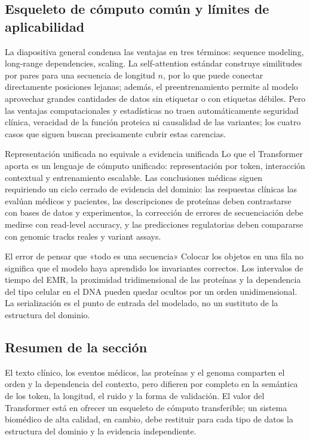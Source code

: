 \subsection{Esqueleto de cómputo común y límites de aplicabilidad}

La diapositiva general condensa las ventajas en tres términos: sequence modeling, long-range dependencies, scaling. La self-attention estándar construye similitudes por pares para una secuencia de longitud $n$, por lo que puede conectar directamente posiciones lejanas; además, el preentrenamiento permite al modelo aprovechar grandes cantidades de datos sin etiquetar o con etiquetas débiles. Pero las ventajas computacionales y estadísticas no traen automáticamente seguridad clínica, veracidad de la función proteica ni causalidad de las variantes; los cuatro casos que siguen buscan precisamente cubrir estas carencias.


\begin{importantbox}{Representación unificada no equivale a evidencia unificada}
Lo que el Transformer aporta es un lenguaje de cómputo unificado: representación por token, interacción contextual y entrenamiento escalable. Las conclusiones médicas siguen requiriendo un ciclo cerrado de evidencia del dominio: las respuestas clínicas las evalúan médicos y pacientes, las descripciones de proteínas deben contrastarse con bases de datos y experimentos, la corrección de errores de secuenciación debe medirse con read-level accuracy, y las predicciones regulatorias deben compararse con genomic tracks reales y variant assays.
\end{importantbox}

\begin{warningbox}{El error de pensar que «todo es una secuencia»}
Colocar los objetos en una fila no significa que el modelo haya aprendido los invariantes correctos. Los intervalos de tiempo del EMR, la proximidad tridimensional de las proteínas y la dependencia del tipo celular en el DNA pueden quedar ocultos por un orden unidimensional. La serialización es el punto de entrada del modelado, no un sustituto de la estructura del dominio.
\end{warningbox}

\subsection{Resumen de la sección}

El texto clínico, los eventos médicos, las proteínas y el genoma comparten el orden y la dependencia del contexto, pero difieren por completo en la semántica de los token, la longitud, el ruido y la forma de validación. El valor del Transformer está en ofrecer un esqueleto de cómputo transferible; un sistema biomédico de alta calidad, en cambio, debe restituir para cada tipo de datos la estructura del dominio y la evidencia independiente.
